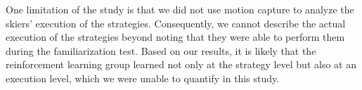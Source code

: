One limitation of the study is that we did not use motion capture to analyze the skiers' execution of the strategies. Consequently, we cannot describe the actual execution of the strategies beyond noting that they were able to perform them during the familiarization test. Based on our results, it is likely that the reinforcement learning group learned not only at the strategy level but also at an execution level, which we were unable to quantify in this study.






 